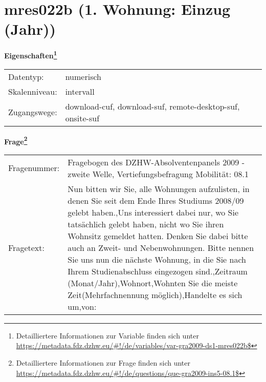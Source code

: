 
    \setcounter{footnote}{0}

    \vspace*{-1.8cm}
	\section{mres022b (1. Wohnung: Einzug (Jahr))}
	\label{section:mres022b}



    \vspace*{0.5cm}
    \noindent\textbf{Eigenschaften\footnote{Detailliertere Informationen zur Variable finden sich unter
		\url{https://metadata.fdz.dzhw.eu/\#!/de/variables/var-gra2009-ds1-mres022b$}}}\\
	\begin{tabularx}{\hsize}{@{}lX}
	Datentyp: & numerisch \\
	Skalenniveau: & intervall \\
	Zugangswege: &
	  download-cuf, 
	  download-suf, 
	  remote-desktop-suf, 
	  onsite-suf
 \\
    \end{tabularx}



				\vspace*{0.5cm}
                \noindent\textbf{Frage\footnote{Detailliertere Informationen zur Frage finden sich unter
		              \url{https://metadata.fdz.dzhw.eu/\#!/de/questions/que-gra2009-ins5-08.1$}}}\\
				\begin{tabularx}{\hsize}{@{}lX}
					Fragenummer: &
					  Fragebogen des DZHW-Absolventenpanels 2009 - zweite Welle, Vertiefungsbefragung Mobilität:
					  08.1
 \\
					Fragetext: & Nun bitten wir Sie, alle Wohnungen aufzulisten, in denen Sie seit dem Ende Ihres Studiums 2008/09 gelebt haben.,Uns interessiert dabei nur, wo Sie tatsächlich gelebt haben, nicht wo Sie ihren Wohnsitz gemeldet hatten. Denken Sie dabei bitte auch an Zweit- und Nebenwohnungen. Bitte nennen Sie uns nun die nächste Wohnung, in die Sie nach Ihrem Studienabschluss eingezogen sind.,Zeitraum (Monat/Jahr),Wohnort,Wohnten Sie die meiste Zeit(Mehrfachnennung möglich),Handelte es sich um,von: \\
				\end{tabularx}





